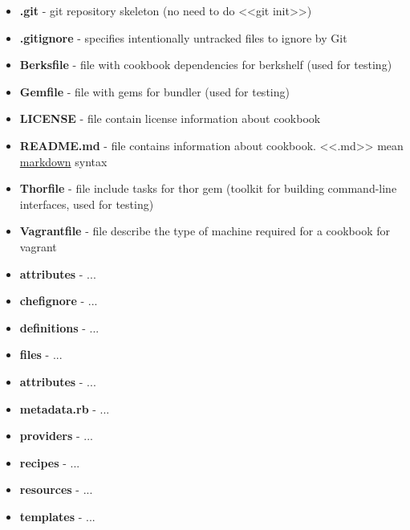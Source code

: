 \begin{itemize}
  \item \textbf{.git} - git repository skeleton (no need to do <<git init>>)
  \item \textbf{.gitignore} - specifies intentionally untracked files to ignore by Git
  \item \textbf{Berksfile} - file with cookbook dependencies for berkshelf (used for testing)
  \item \textbf{Gemfile} - file with gems for bundler (used for testing)
  \item \textbf{LICENSE} - file contain license information about cookbook
  \item \textbf{README.md} - file contains information about cookbook. <<.md>> mean \href{http://daringfireball.net/projects/markdown/syntax}{markdown} syntax
  \item \textbf{Thorfile} - file include tasks for thor gem (toolkit for building command-line interfaces, used for testing)
  \item \textbf{Vagrantfile} - file describe the type of machine required for a cookbook for vagrant
  \item \textbf{attributes} - ...
  \item \textbf{chefignore} - ...
  \item \textbf{definitions} - ...
  \item \textbf{files} - ...
  \item \textbf{attributes} - ...
  \item \textbf{metadata.rb} - ...
  \item \textbf{providers} - ...
  \item \textbf{recipes} - ...
  \item \textbf{resources} - ...
  \item \textbf{templates} - ...
\end{itemize}